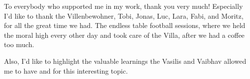 To everybody who supported me in my work, thank you very much! Especially I'd
like to thank the Villenbewohner, Tobi, Jonas, Luc, Lara, Fabi, and Moritz, for
all the great time we had. The endless table football sessions, where we held
the moral high every other day and took care of the Villa, after we had a
coffee too much.

Also, I'd like to highlight the valuable learnings the Vasilis and Vaibhav
allowed me to have and for this interesting topic.
